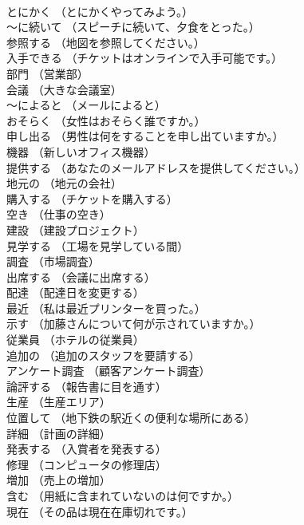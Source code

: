 \documentclass[8pt]{extreport}
\begin{document}
\begin{CJK}{UTF8}{min}
\\	とにかく	（とにかくやってみよう。）		
\\	～に続いて	（スピーチに続いて、夕食をとった。）		
\\	参照する	（地図を参照してください。）		
\\	入手できる	（チケットはオンラインで入手可能です。）		
\\	部門	（営業部）		
\\	会議	（大きな会議室）		
\\	～によると	（メールによると）		
\\	おそらく	（女性はおそらく誰ですか。）		
\\	申し出る	（男性は何をすることを申し出ていますか。）		
\\	機器	（新しいオフィス機器）		
\\	提供する	（あなたのメールアドレスを提供してください。）		
\\	地元の	（地元の会社）		
\\	購入する	（チケットを購入する）		
\\	空き	（仕事の空き）		
\\	建設	（建設プロジェクト）		
\\	見学する	（工場を見学している間）		
\\	調査	（市場調査）		
\\	出席する	（会議に出席する）		
\\	配達	（配達日を変更する）		
\\	最近	（私は最近プリンターを買った。）		
\\	示す	（加藤さんについて何が示されていますか。）		
\\	従業員	（ホテルの従業員）		
\\	追加の	（追加のスタッフを要請する）		
\\	アンケート調査	（顧客アンケート調査）		
\\	論評する	（報告書に目を通す）		
\\	生産	（生産エリア）		
\\	位置して	（地下鉄の駅近くの便利な場所にある）		
\\	詳細	（計画の詳細）		
\\	発表する	（入賞者を発表する）		
\\	修理	（コンピュータの修理店）		
\\	増加	（売上の増加）		
\\	含む	（用紙に含まれていないのは何ですか。）		
\\	現在	（その品は現在在庫切れです。）		

\end{CJK}
\end{document}
